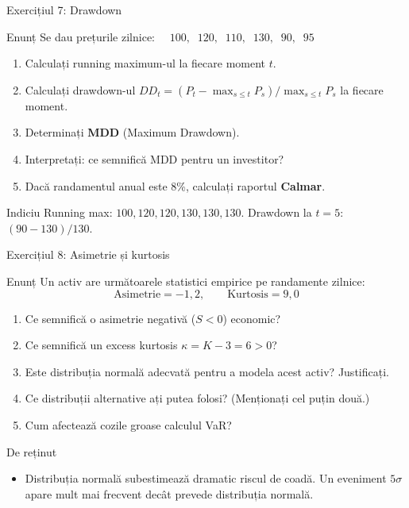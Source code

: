 \documentclass[9pt, aspectratio=169, t]{beamer}
\theoremstyle{definition}
\begin{document}
\begin{frame}{Exercițiul 7: Drawdown}
\begin{block}{Enunț}
Se dau prețurile zilnice: $\quad 100, \;\; 120, \;\; 110, \;\; 130, \;\; 90, \;\; 95$
\end{block}
\begin{enumerate}
    \item Calculați running maximum-ul la fiecare moment $t$.
    \item Calculați drawdown-ul $DD_t = (P_t - \max_{s \leq t} P_s) / \max_{s \leq t} P_s$ la fiecare moment.
    \item Determinați \textbf{MDD} (Maximum Drawdown).
    \item Interpretați: ce semnifică MDD pentru un investitor?
    \item Dacă randamentul anual este 8\%, calculați raportul \textbf{Calmar}.
\end{enumerate}
\vspace{0.1cm}
\begin{exampleblock}{Indiciu}
Running max: $100, 120, 120, 130, 130, 130$. Drawdown la $t=5$: $(90-130)/130$.
\end{exampleblock}
\end{frame}

\begin{frame}{Exercițiul 8: Asimetrie și kurtosis}
\begin{block}{Enunț}
Un activ are următoarele statistici empirice pe randamente zilnice:
\[
\text{Asimetrie} = -1{,}2, \qquad \text{Kurtosis} = 9{,}0
\]
\end{block}
\begin{enumerate}
    \item Ce semnifică o asimetrie negativă ($S < 0$) economic?
    \item Ce semnifică un excess kurtosis $\kappa = K - 3 = 6 > 0$?
    \item Este distribuția normală adecvată pentru a modela acest activ? Justificați.
    \item Ce distribuții alternative ați putea folosi? (Menționați cel puțin două.)
    \item Cum afectează cozile groase calculul VaR?
\end{enumerate}
\vspace{0.1cm}
\begin{alertblock}{De reținut}
\begin{itemize}\setlength{\itemsep}{0pt}
    \item Distribuția normală subestimează dramatic riscul de coadă. Un eveniment $5\sigma$ apare mult mai frecvent decât prevede distribuția normală.
\end{itemize}
\end{alertblock}
\end{frame}
\end{document}
